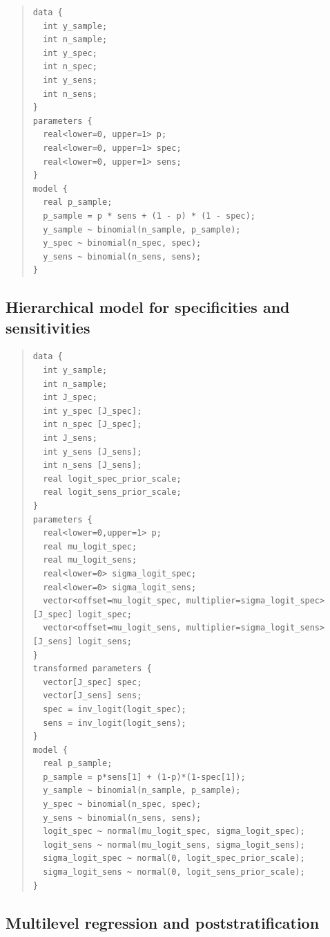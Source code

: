 \documentclass[11pt]{article}
\begin{document}
    \begin{small}
  \begin{quotation}\noindent
\begin{verbatim}
data {
  int y_sample;
  int n_sample;
  int y_spec;
  int n_spec;
  int y_sens;
  int n_sens;
}
parameters {
  real<lower=0, upper=1> p;
  real<lower=0, upper=1> spec;
  real<lower=0, upper=1> sens;
}
model {
  real p_sample;
  p_sample = p * sens + (1 - p) * (1 - spec);
  y_sample ~ binomial(n_sample, p_sample);
  y_spec ~ binomial(n_spec, spec);
  y_sens ~ binomial(n_sens, sens);
}
\end{verbatim}
\end{quotation}
\end{small}

\subsection{Hierarchical model for specificities and sensitivities}\label{stan3}

  \begin{small}
  \begin{quotation}\noindent
\begin{verbatim}
data {
  int y_sample;
  int n_sample;
  int J_spec;
  int y_spec [J_spec];
  int n_spec [J_spec];
  int J_sens;
  int y_sens [J_sens];
  int n_sens [J_sens];
  real logit_spec_prior_scale;
  real logit_sens_prior_scale;
}
parameters {
  real<lower=0,upper=1> p;
  real mu_logit_spec;
  real mu_logit_sens;
  real<lower=0> sigma_logit_spec;
  real<lower=0> sigma_logit_sens;
  vector<offset=mu_logit_spec, multiplier=sigma_logit_spec>[J_spec] logit_spec;
  vector<offset=mu_logit_sens, multiplier=sigma_logit_sens>[J_sens] logit_sens;
}
transformed parameters {
  vector[J_spec] spec;
  vector[J_sens] sens;
  spec = inv_logit(logit_spec);
  sens = inv_logit(logit_sens);
}
model {
  real p_sample;
  p_sample = p*sens[1] + (1-p)*(1-spec[1]);
  y_sample ~ binomial(n_sample, p_sample);
  y_spec ~ binomial(n_spec, spec);
  y_sens ~ binomial(n_sens, sens);
  logit_spec ~ normal(mu_logit_spec, sigma_logit_spec);
  logit_sens ~ normal(mu_logit_sens, sigma_logit_sens);
  sigma_logit_spec ~ normal(0, logit_spec_prior_scale);
  sigma_logit_sens ~ normal(0, logit_sens_prior_scale);
}
\end{verbatim}
\end{quotation}
\end{small}

\subsection{Multilevel regression and poststratification}\label{stan4}
\end{document}
